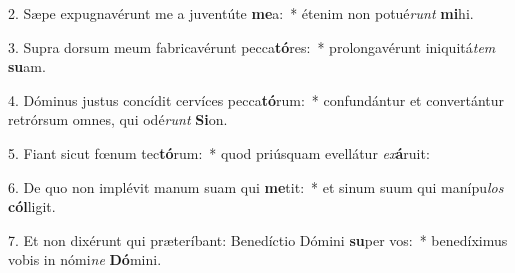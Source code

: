 2. Sæpe expugnavérunt me a juventúte \textbf{me}a:~*  étenim non potué\textit{runt} \textbf{mi}hi.\

3. Supra dorsum meum fabricavérunt pecca\textbf{tó}res:~*  prolongavérunt iniquitá\textit{tem} \textbf{su}am.\

4. Dóminus justus concídit cervíces pecca\textbf{tó}rum:~*  confundántur et convertántur retrórsum omnes, qui odé\textit{runt} \textbf{Si}on.\

5. Fiant sicut fœnum tec\textbf{tó}rum:~*  quod priúsquam evellátur \textit{ex}\textbf{á}ruit:\

6. De quo non implévit manum suam qui \textbf{me}tit:~*  et sinum suum qui manípu\textit{los} \textbf{cól}ligit.\

7. Et non dixérunt qui præteríbant: Benedíctio Dómini \textbf{su}per vos:~*  benedíximus vobis in nómi\textit{ne} \textbf{Dó}mini.\

